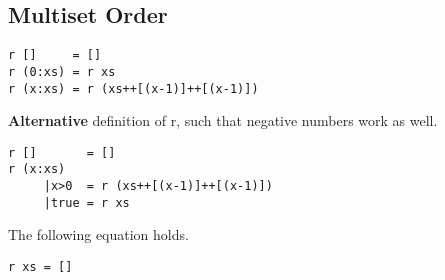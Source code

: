 \subsection{Multiset Order}
\begin{verbatim}
r []     = []
r (0:xs) = r xs
r (x:xs) = r (xs++[(x-1)]++[(x-1)])
\end{verbatim}
\textbf{Alternative} definition of r, such that negative numbers work as well.
\begin{verbatim}
r []       = []
r (x:xs) 
     |x>0  = r (xs++[(x-1)]++[(x-1)])
     |true = r xs
\end{verbatim}
\begin{claim}The following equation holds.
\begin{verbatim}
r xs = []
\end{verbatim}
\end{claim}
